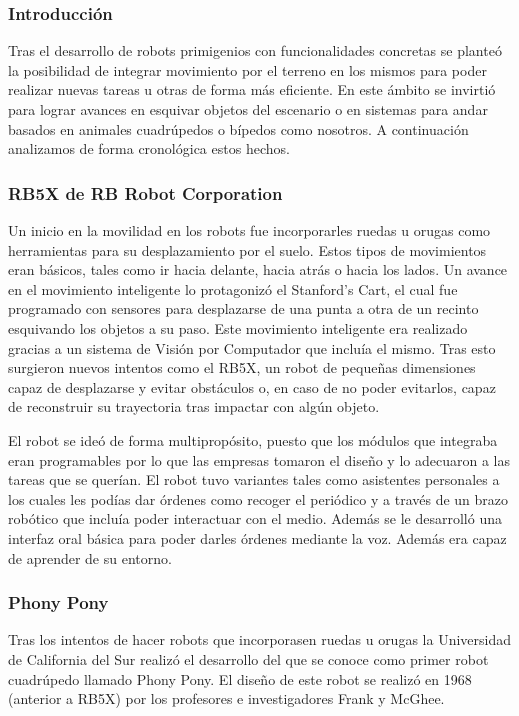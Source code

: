\subsubsection{Introducción}

Tras el desarrollo de robots primigenios con funcionalidades concretas se planteó la posibilidad de integrar movimiento por el terreno en los mismos para poder realizar nuevas tareas u otras de forma más eficiente. En este ámbito se invirtió para lograr avances en esquivar objetos del escenario o en sistemas para andar basados en animales cuadrúpedos o bípedos como nosotros. A continuación analizamos de forma cronológica estos hechos.

\subsubsection{RB5X de RB Robot Corporation}
Un inicio en la movilidad en los robots fue incorporarles ruedas u orugas como herramientas para su desplazamiento por el suelo. Estos tipos de movimientos eran básicos, tales como ir hacia delante, hacia atrás o hacia los lados. Un avance en el movimiento inteligente lo protagonizó el Stanford's Cart, el cual fue programado con sensores para desplazarse de una punta a otra de un recinto esquivando los objetos a su paso. Este movimiento inteligente era realizado gracias a un sistema de Visión por Computador que incluía el mismo. Tras esto surgieron nuevos intentos como el RB5X, un robot de pequeñas dimensiones capaz de desplazarse y evitar obstáculos o, en caso de no poder evitarlos, capaz de reconstruir su trayectoria tras impactar con algún objeto.

\vspace{10px}

El robot se ideó de forma multipropósito, puesto que los módulos que integraba eran programables por lo que las empresas tomaron el diseño y lo adecuaron a las tareas que se querían. El robot tuvo variantes tales como asistentes personales a los cuales les podías dar órdenes como recoger el periódico y a través de un brazo robótico que incluía poder interactuar con el medio. Además se le desarrolló una interfaz oral básica para poder darles órdenes mediante la voz. Además era capaz de aprender de su entorno.

\subsubsection{Phony Pony}

Tras los intentos de hacer robots que incorporasen ruedas u orugas la Universidad de California del Sur realizó el desarrollo del que se conoce como primer robot cuadrúpedo llamado Phony Pony. El diseño de este robot se realizó en 1968 (anterior a RB5X) por los profesores e investigadores Frank y McGhee.

